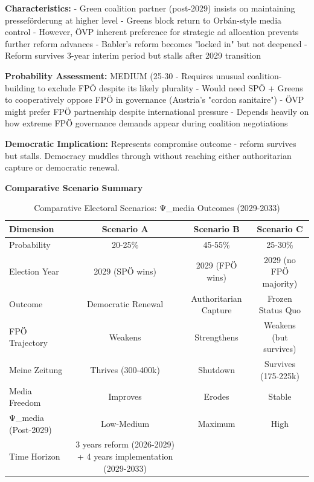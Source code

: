 \textbf{Characteristics:}
- Green coalition partner (post-2029) insists on maintaining presseförderung at higher level
- Greens block return to Orbán-style media control
- However, ÖVP inherent preference for strategic ad allocation prevents further reform advances
- Babler's reform becomes "locked in" but not deepened
- Reform survives 3-year interim period but stalls after 2029 transition

\textbf{Probability Assessment:} MEDIUM (25-30%
- Requires unusual coalition-building to exclude FPÖ despite its likely plurality
- Would need SPÖ + Greens to cooperatively oppose FPÖ in governance (Austria's "cordon sanitaire")
- ÖVP might prefer FPÖ partnership despite international pressure
- Depends heavily on how extreme FPÖ governance demands appear during coalition negotiations

\textbf{Democratic Implication:} Represents compromise outcome - reform survives but stalls.
Democracy muddles through without reaching either authoritarian capture or democratic renewal.

\vspace{0.5cm}

\textbf{Comparative Scenario Summary}

\begin{table}[h]
\centering
\caption{Comparative Electoral Scenarios: Ψ_media Outcomes (2029-2033)}
\label{tab:dx-scenario-summary}
\begin{tabular}{|l|c|c|c|}
\hline
\textbf{Dimension} & \textbf{Scenario A} & \textbf{Scenario B} & \textbf{Scenario C} \\
\hline
Probability & 20-25\% & 45-55\% & 25-30\% \\
Election Year & 2029 (SPÖ wins) & 2029 (FPÖ wins) & 2029 (no FPÖ majority) \\
Outcome & Democratic Renewal & Authoritarian Capture & Frozen Status Quo \\
FPÖ Trajectory & Weakens & Strengthens & Weakens (but survives) \\
Meine Zeitung & Thrives (300-400k) & Shutdown & Survives (175-225k) \\
Media Freedom & Improves & Erodes & Stable \\
Ψ_media (Post-2029) & Low-Medium & Maximum & High \\
Time Horizon & 3 years reform (2026-2029) + 4 years implementation (2029-2033) \\
\hline
\end{tabular}
\end{table}


